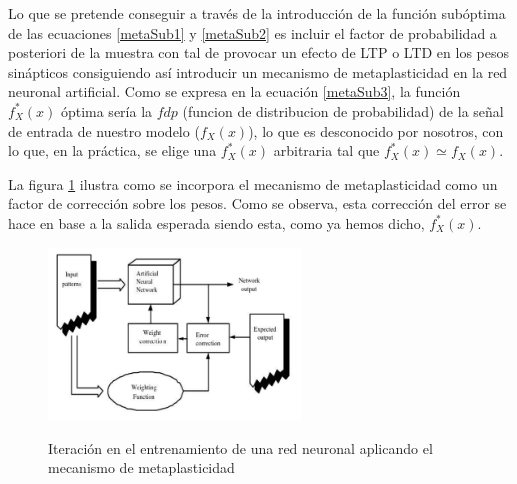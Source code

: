 \documentclass[10pt,a4paper]{report}
\begin{document}
Lo que se pretende conseguir a través de la introducción de la función subóptima de las ecuaciones \ref{metaSub1} y \ref{metaSub2} es incluir el factor de probabilidad a posteriori de la muestra con tal de provocar un efecto de LTP o LTD en los pesos sinápticos consiguiendo así introducir un mecanismo de metaplasticidad en la red neuronal artificial.
Como se expresa en la ecuación \ref{metaSub3}, la función $f^*_X(x)$ óptima sería la $fdp$ (funcion de distribucion de probabilidad) de la señal de entrada de nuestro modelo ($f_X(x)$), lo que es desconocido por nosotros, con lo que, en la práctica, se elige una $f^*_X(x)$ arbitraria tal que $f^*_X(x) \simeq f_X(x)$.

La figura \ref{fig:WeightedTrainEpoch} ilustra como se incorpora el mecanismo de metaplasticidad como un factor de corrección sobre los pesos. Como se observa, esta corrección del error se hace en base a la salida esperada siendo esta, como ya hemos dicho, $f^*_X(x)$.

\begin{figure}[h!]{}
    \centering
    \includegraphics[width=0.6\textwidth]{img/weightingOperation.png}
    \label{fig:WeightedTrainEpoch}
    \caption{Iteración en el entrenamiento de una red neuronal aplicando el mecanismo de metaplasticidad}
\end{figure}
\end{document}
